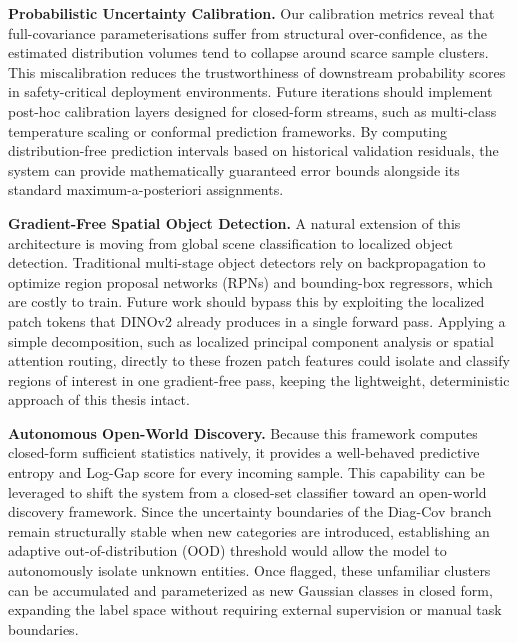 \textbf{Probabilistic Uncertainty Calibration.}
Our calibration metrics reveal that full-covariance parameterisations suffer from structural over-confidence, as the estimated distribution volumes tend to collapse around scarce sample clusters. This miscalibration reduces the trustworthiness of downstream probability scores in safety-critical deployment environments. Future iterations should implement post-hoc calibration layers designed for closed-form streams, such as multi-class temperature scaling or conformal prediction frameworks. By computing distribution-free prediction intervals based on historical validation residuals, the system can provide mathematically guaranteed error bounds alongside its standard maximum-a-posteriori assignments.


\textbf{Gradient-Free Spatial Object Detection.}
A natural extension of this architecture is moving from global scene classification to localized object detection. Traditional multi-stage object detectors rely on backpropagation to optimize region proposal networks (RPNs) and bounding-box regressors, which are costly to train. Future work should bypass this by exploiting the localized patch tokens that DINOv2 already produces in a single forward pass. Applying a simple decomposition, such as localized principal component analysis or spatial attention routing, directly to these frozen patch features could isolate and classify regions of interest in one gradient-free pass, keeping the lightweight, deterministic approach of this thesis intact.

\textbf{Autonomous Open-World Discovery.}
Because this framework computes closed-form sufficient statistics natively, it provides a well-behaved predictive entropy and Log-Gap score for every incoming sample. This capability can be leveraged to shift the system from a closed-set classifier toward an open-world discovery framework. Since the uncertainty boundaries of the Diag-Cov branch remain structurally stable when new categories are introduced, establishing an adaptive out-of-distribution (OOD) threshold would allow the model to autonomously isolate unknown entities. Once flagged, these unfamiliar clusters can be accumulated and parameterized as new Gaussian classes in closed form, expanding the label space without requiring external supervision or manual task boundaries.

